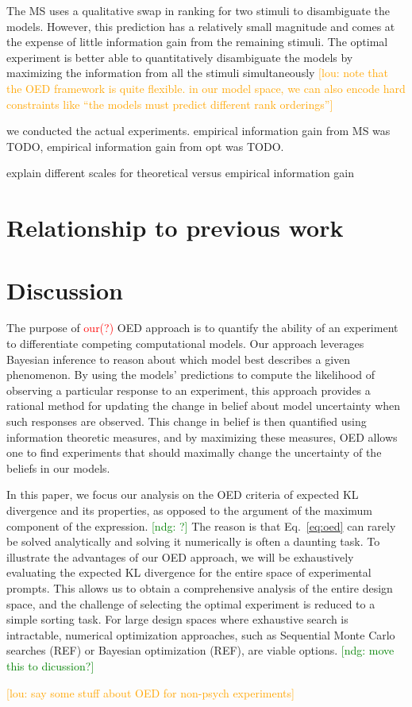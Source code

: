 \documentclass{article}
\newcommand{\red}[1]{\textcolor{Red}{#1}}
\newcommand{\ndg}[1]{\textcolor{Green}{[ndg: #1]}}
\newcommand{\lou}[1]{\textcolor{orange}{[lou: #1]}}
\newcommand{\cas}[1]{ \textsf{\color{darkgray} \scriptsize #1} }
\begin{document}
The MS uses a qualitative swap in ranking for two stimuli to disambiguate the models.
However, this prediction has a relatively small magnitude and comes at the expense of little information gain from the remaining stimuli.
The optimal experiment is better able to quantitatively disambiguate the models by maximizing the information from all the stimuli simultaneously
\lou{note that the OED framework is quite flexible. in our model space, we can also encode hard constraints like ``the models must predict different rank orderings''}

\cas{we conducted the actual experiments. empirical information gain from MS was TODO, empirical information gain from opt was TODO.}

\cas{explain different scales for theoretical versus empirical information gain}

\section{Relationship to previous work}
\section{Discussion}

The purpose of \red{our(?)} OED approach is to quantify the ability of an experiment to differentiate competing computational models. Our approach leverages Bayesian inference to reason about which model best describes a given phenomenon. By using the models' predictions to compute the likelihood of observing a particular response to an experiment, this approach provides a rational method for updating the change in belief about model uncertainty when such responses are observed. This change in belief is then quantified using information theoretic measures, and by maximizing these measures, OED allows one to find experiments that should maximally change the uncertainty of the beliefs in our models.


In this paper, we focus our analysis on the OED criteria of expected KL divergence and its properties, as opposed to the argument of the maximum component of the expression. \ndg{?} The reason is that Eq.~\ref{eq:oed} can rarely be solved analytically and solving it numerically is often a daunting task. To illustrate the advantages of our OED approach, we will be exhaustively evaluating the expected KL divergence for the entire  space of experimental prompts. This allows us to obtain a comprehensive analysis of the entire design space, and the challenge of selecting the optimal experiment is reduced to a simple sorting task. For large design spaces where exhaustive search is intractable, numerical optimization approaches, such as Sequential Monte Carlo searches (REF) or Bayesian optimization (REF), are viable options.  \ndg{move this to dicussion?}



\lou{say some stuff about OED for non-psych experiments}



\end{document}
